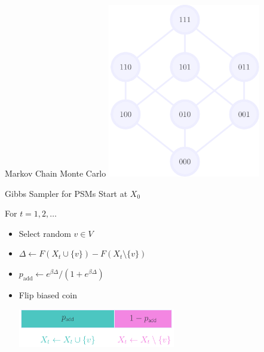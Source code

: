 \documentclass[mathserif]{beamer}
\begin{document}
\begin{frame}{Markov Chain Monte Carlo}
\vspace{0.5em}
\centering
\includegraphics[height=3in]{figures/lattice_full_binary.pdf}
\end{frame}

\begin{frame}{Gibbs Sampler for PSMs}
\vspace{1em}
Start at $X_0$

\vspace{1.1em}
For $t = 1, 2, \ldots$
\vspace{1.1em}
\begin{itemize}
\item Select random $v \in V$
\vspace{1.1em}
\item $\Delta \leftarrow F(X_t \cup \{v\}) - F(X_t \setminus \{v\})$
\vspace{1.1em}
\item $p_{\textrm{add}} \leftarrow e^{\beta \Delta} / \left(1 + e^{\beta \Delta}\right)$
\vspace{1.1em}
\item Flip biased coin

\vspace{-1em}
\begin{minipage}{0.5\textwidth}\vspace{2em}\includegraphics[width=2.7in]{figures/gibbs.pdf}\end{minipage}
\end{itemize}
\end{frame}
\end{document}
